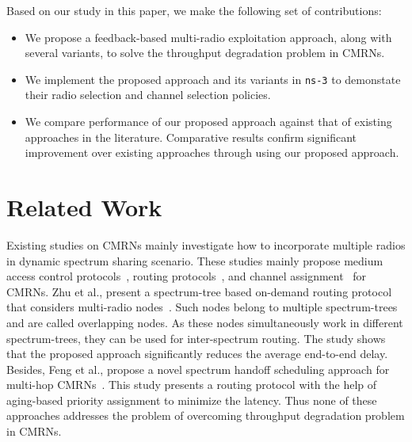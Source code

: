 \documentclass[letterpaper,conference]{IEEEtran}
\begin{document}

Based on our study in this paper, we make the following set of contributions:

\begin{itemize}
\item We propose a feedback-based multi-radio exploitation approach, along with several variants, to solve the throughput degradation problem in CMRNs.
\item We implement the proposed approach and its variants in \texttt{ns-3} to demonstate their radio selection and channel selection policies.
\item We compare performance of our proposed approach against that of existing approaches in the literature. Comparative results confirm significant improvement over existing approaches through using our proposed approach.
\end{itemize}

\section{Related Work}

Existing studies on CMRNs mainly investigate how to incorporate multiple radios in dynamic spectrum sharing scenario. These studies mainly propose medium access control protocols~\cite{cormio2009survey, de2012survey}, routing protocols~\cite{zhu2008stod, feng2009joint}, and channel assignment~\cite{ahmadi2012distributed, zhong2014capacity} for CMRNs. Zhu et al., present a spectrum-tree based on-demand routing protocol that considers multi-radio nodes~\cite{zhu2008stod}. Such nodes belong to multiple spectrum-trees and are called overlapping nodes. As these nodes simultaneously work in different spectrum-trees, they can be used for inter-spectrum routing. The study shows that the proposed approach significantly reduces the average end-to-end delay.  Besides, Feng et al., propose a novel spectrum handoff scheduling approach for multi-hop CMRNs~\cite{feng2009joint}. This study presents a routing protocol with the help of aging-based priority assignment to minimize the latency. Thus none of these approaches addresses the problem of overcoming throughput degradation problem in CMRNs.
\end{document}
